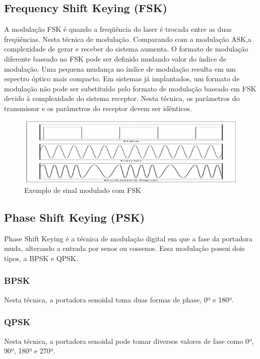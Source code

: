 \documentclass[article]{IEEEtran}
\begin{document}
\subsection{Frequency Shift Keying (FSK)}
\par A modulação FSK é quando a freqüência do laser é trocada entre as duas freqüências. Nesta técnica de modulação. Comparando com a modulação ASK,a complexidade de gerar e receber do sistema aumenta. O formato de modulação diferente baseado no FSK pode ser definido mudando valor do índice de modulação. Uma pequena mudança no índice de modulação resulta em um espectro óptico mais compacto. Em sistemas já implantados, um formato de modulação não pode ser substituído pelo formato de modulação baseado em FSK devido à complexidade do sistema receptor. Nesta técnica, os parâmetros do transmissor e os  parâmetros do receptor devem ser idênticos.\cite{MODULATION}

\begin{figure}[hb]
\includegraphics[width=\columnwidth]{fsk.png}
\caption{Exemplo de sinal modulado com FSK}
\end{figure}

\subsection{Phase Shift Keying (PSK)}
\par Phase Shift Keying é a técnica de modulação digital em que a fase da portadora muda, alterando a entrada por senos ou cossenos. Essa modulação possui  dois tipos, a BPSK e QPSK.
\subsubsection{BPSK}
\par Nesta técnica, a portadora senoidal toma duas formas de phase, 0º e 180º.
\subsubsection{QPSK}
\par Nesta técnica, a portadora senoidal pode tomar diversos valores de fase como 0º, 90º, 180º e 270º.
\end{document}
